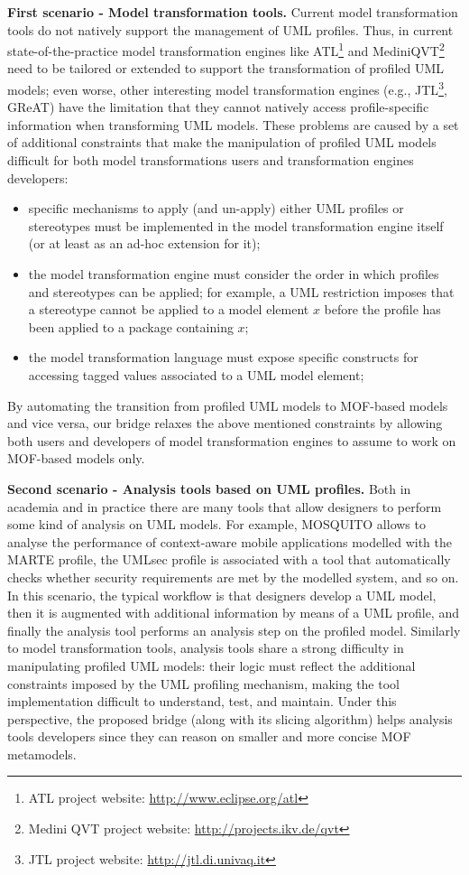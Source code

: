 \textbf{First scenario - Model transformation tools.}
Current model transformation tools do not natively support the management of UML profiles.
Thus, in current state-of-the-practice model transformation engines 
like ATL\footnote{ATL project website: \small{\url{http://www.eclipse.org/atl}}} and
MediniQVT\footnote{Medini QVT project website: \small{\url{http://projects.ikv.de/qvt}}}
need to be tailored or extended to support the transformation of profiled UML models; 
even worse, other interesting model transformation engines (e.g.,   
JTL\footnote{JTL project website: \small{\url{http://jtl.di.univaq.it}}}, GReAT) 
have the limitation that they cannot natively access profile-specific information when transforming UML models.
These problems are caused by a set of additional constraints that make the manipulation of profiled UML models difficult for both model transformations users and transformation engines developers:
%
\begin{itemize}
	\item specific mechanisms to apply (and un-apply) either UML profiles or stereotypes must be implemented 
	in the model transformation engine itself (or at least as an ad-hoc extension for it);
	\item the model transformation engine must consider the order in which profiles and stereotypes can be applied; 
	for example, a UML restriction imposes that a stereotype cannot be applied to a model element $x$ before 
	the profile has been applied to a package containing $x$;
	\item the model transformation language must expose specific constructs for accessing tagged values associated to a UML model element;
\end{itemize}
%
By automating the transition from profiled UML models to MOF-based models and vice versa, our bridge relaxes the above mentioned constraints
by allowing both users and developers of model transformation engines to assume to work on MOF-based models only.

\textbf{Second scenario - Analysis tools based on UML profiles.}
Both in academia and in practice there are many tools that allow designers to perform some kind of analysis on UML models.
For example, MOSQUITO\cite{perfMarte} allows to analyse the performance of context-aware mobile 
applications modelled with the MARTE profile, 
the UMLsec profile\cite{securityUMLsec} is associated with a tool that automatically checks whether security 
requirements are met by the modelled system, and so on.
In this scenario, the typical workflow is that designers develop a UML model, then it is augmented with additional information by means of a UML profile, and finally the analysis tool performs an analysis step on the profiled model.
Similarly to model transformation tools, analysis tools share a strong difficulty in manipulating profiled UML models:
their logic must reflect the additional constraints imposed by the UML profiling mechanism, making the tool
implementation difficult to understand, test, and maintain.
Under this perspective, the proposed bridge (along with its slicing algorithm)
helps analysis tools developers since they can reason on smaller and more concise MOF metamodels.
  
